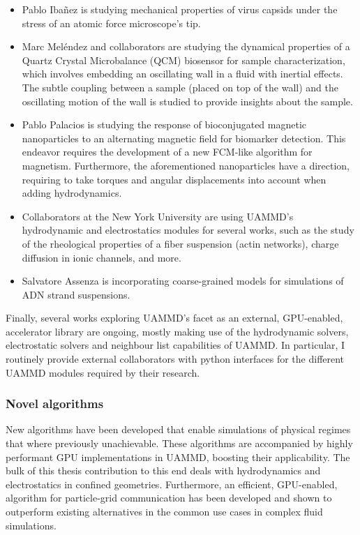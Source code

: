 \documentclass[ twoside,openright,titlepage,numbers=noenddot,%
headinclude,footinclude,cleardoublepage=empty,abstract=on,
BCOR=5mm,paper=b5,fontsize=11pt, dvipsnames
]{scrreprt}
\begin{document}
\begin{itemize}
\item Pablo Ibañez is studying mechanical properties of virus capsids under the stress of an atomic force microscope's tip.
\item Marc Meléndez and collaborators are studying the dynamical properties of a Quartz Crystal Microbalance (QCM) biosensor for sample characterization, which involves embedding an oscillating wall in a fluid with inertial effects. The subtle coupling between a sample (placed on top of the wall) and the oscillating motion of the wall is studied to provide insights about the sample.
\item Pablo Palacios is studying the response of bioconjugated magnetic nanoparticles to an alternating magnetic field for biomarker detection. This endeavor requires the development of a new \gls{FCM}-like algorithm for magnetism. Furthermore, the aforementioned nanoparticles have a direction, requiring to take torques and angular displacements into account when adding hydrodynamics.
\item Collaborators at the New York University are using UAMMD's hydrodynamic and electrostatics modules for several works, such as the study of the rheological properties of a fiber suspension (actin networks), charge diffusion in ionic channels, and more. 
\item Salvatore Assenza is incorporating coarse-grained models for simulations of ADN strand suspensions.
\end{itemize}

Finally, several works exploring UAMMD's facet as an external, GPU-enabled, accelerator library are ongoing, mostly making use of the hydrodynamic solvers, electrostatic solvers and neighbour list capabilities of UAMMD. In particular, I routinely provide external collaborators with python interfaces for the different UAMMD modules required by their research.

\subsubsection*{Novel algorithms}
New algorithms have been developed that enable simulations of physical regimes that where previously unachievable. These algorithms are accompanied by highly performant GPU implementations in UAMMD, boosting their applicability. The bulk of this thesis contribution to this end deals with hydrodynamics and electrostatics in confined geometries. Furthermore, an efficient, GPU-enabled, algorithm for particle-grid communication has been developed and shown to outperform existing alternatives in the common use cases in complex fluid simulations.
\end{document}
